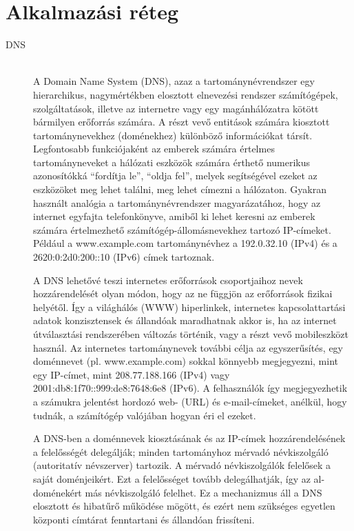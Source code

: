 \documentclass[margin=0px]{article}
\begin{document}
\section{Alkalmazási réteg}
\begin{description}
    \item[DNS] \hfill \\
        A Domain Name System (DNS), azaz a tartománynévrendszer egy hierarchikus, nagymértékben elosztott elnevezési rendszer számítógépek, szolgáltatások, illetve az internetre vagy egy magánhálózatra kötött bármilyen erőforrás számára. A részt vevő entitások számára kiosztott tartománynevekhez (doménekhez) különböző információkat társít. Legfontosabb funkciójaként az emberek számára értelmes tartományneveket a hálózati eszközök számára érthető numerikus azonosítókká ``fordítja le'', ``oldja fel'', melyek segítségével ezeket az eszközöket meg lehet találni, meg lehet címezni a hálózaton.
        Gyakran használt analógia a tartománynévrendszer magyarázatához, hogy az internet egyfajta telefonkönyve, amiből ki lehet keresni az emberek számára értelmezhető számítógép-állomásnevekhez tartozó IP-címeket. Például a www.example.com tartománynévhez a 192.0.32.10 (IPv4) és a 2620:0:2d0:200::10 (IPv6) címek tartoznak.

        A DNS lehetővé teszi internetes erőforrások csoportjaihoz nevek hozzárendelését olyan módon, hogy az ne függjön az erőforrások fizikai helyétől. Így a világhálós (WWW) hiperlinkek, internetes kapcsolattartási adatok konzisztensek és állandóak maradhatnak akkor is, ha az internet útválasztási rendszerében változás történik, vagy a részt vevő mobileszközt használ. Az internetes tartománynevek további célja az egyszerűsítés, egy doménnevet (pl. www.example.com) sokkal könnyebb megjegyezni, mint egy IP-címet, mint 208.77.188.166 (IPv4) vagy 2001:db8:1f70::999:de8:7648:6e8 (IPv6). A felhasználók így megjegyezhetik a számukra jelentést hordozó web- (URL) és e-mail-címeket, anélkül, hogy tudnák, a számítógép valójában hogyan éri el ezeket.

        A DNS-ben a doménnevek kiosztásának és az IP-címek hozzárendelésének a felelősségét delegálják; minden tartományhoz mérvadó névkiszolgáló (autoritatív névszerver) tartozik. A mérvadó névkiszolgálók felelősek a saját doménjeikért. Ezt a felelősséget tovább delegálhatják, így az al-doménekért más névkiszolgáló felelhet. Ez a mechanizmus áll a DNS elosztott és hibatűrő működése mögött, és ezért nem szükséges egyetlen központi címtárat fenntartani és állandóan frissíteni.


\end{description}
\end{document}
